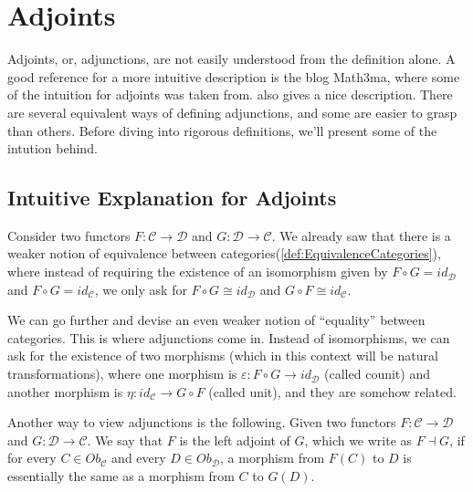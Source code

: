 \chapter{Adjoints}

Adjoints, or, adjunctions, are not easily understood from the definition alone.
A good reference for a more intuitive description is the blog Math3ma, where some of the
intuition for adjoints was taken from. \citet{leinster2014basic} also gives a nice description.
There are several equivalent ways of defining adjunctions, and some are easier to grasp
than others. Before diving into rigorous definitions, we'll present some of the
intution behind.

\section{Intuitive Explanation for Adjoints}

Consider two functors $F:\mathcal C \to \mathcal D$ and $G:\mathcal D \to \mathcal C$.
We already saw that there is a weaker notion
of equivalence between categories(\ref{def:EquivalenceCategories}), where instead of
requiring the existence of an isomorphism given by
$F \circ G = id_\mathcal D$ and $F \circ G = id_\mathcal C$, we only
ask for $F \circ G \cong id_\mathcal D$ and $G \circ F \cong id_\mathcal C$.

We can go further and devise an even weaker notion of ``equality''
between categories.
This is where adjunctions come in. Instead
of isomorphisms, we can ask for the existence of two morphisms
(which in this context will be natural transformations),
where one morphism is $\varepsilon:F\circ G \to id_\mathcal D$ (called counit) and another morphism
is $\eta:id_\mathcal C \to G\circ F $ (called unit), and they are somehow related.

Another way to view adjunctions is the following. Given two functors $F:\mathcal C \to \mathcal D$
and $G:\mathcal D \to \mathcal C$. We say that $F$ is the left adjoint of $G$, which we write as $F \dashv G$,
if for every $C \in Ob_\mathcal C$ and every $D \in Ob_\mathcal D$, a morphism from $F(C)$ to $D$
is essentially the same as a morphism from $C$ to $G(D)$.



